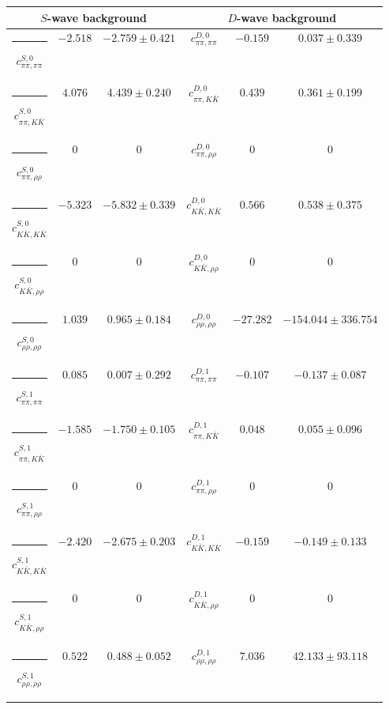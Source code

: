 \begin{table}[h]
\begin{ruledtabular}
\begin{tabular}{c c c c c c c c c}
\end{tabular}
\vspace{2em}
\begin{tabular}{c c c c c c}
\multicolumn{3}{c}{$S$-wave background}  & \multicolumn{3}{c}{$D$-wave background} \\ \hline
\rule[-0.2cm]{-0.1cm}{.55cm} $c^{S,0}_{\pi\pi,\pi\pi}$ &$-2.518$ & $-2.759 \pm 0.421$ & $c^{D,0}_{\pi\pi,\pi\pi}$ &$-0.159$ & $0.037 \pm 0.339$ \\
\rule[-0.2cm]{-0.1cm}{.55cm} $c^{S,0}_{\pi\pi,K\bar K}$ &$4.076$ & $4.439 \pm 0.240$ & $c^{D,0}_{\pi\pi,K\bar K}$ &$0.439$ & $0.361 \pm 0.199$ \\
\rule[-0.2cm]{-0.1cm}{.55cm} $c^{S,0}_{\pi\pi,\rho\rho}$ &$0$ & $0$ & $c^{D,0}_{\pi\pi,\rho\rho}$ &$0$ & $0$ \\
\rule[-0.2cm]{-0.1cm}{.55cm} $c^{S,0}_{K\bar K,K\bar K}$ &$-5.323$ & $-5.832 \pm 0.339$ & $c^{D,0}_{K\bar K,K\bar K}$ &$0.566$ & $0.538 \pm 0.375$ \\
\rule[-0.2cm]{-0.1cm}{.55cm} $c^{S,0}_{K\bar K,\rho\rho}$ &$0$ & $0$ & $c^{D,0}_{K\bar K,\rho\rho}$ &$0$ & $0$ \\
\rule[-0.2cm]{-0.1cm}{.55cm} $c^{S,0}_{\rho\rho,\rho\rho}$ &$1.039$ & $0.965 \pm 0.184$ & $c^{D,0}_{\rho\rho,\rho\rho}$ &$-27.282$ & $-154.044 \pm 336.754$ \\
\rule[-0.2cm]{-0.1cm}{.55cm} $c^{S,1}_{\pi\pi,\pi\pi}$ &$0.085$ & $0.007 \pm 0.292$ & $c^{D,1}_{\pi\pi,\pi\pi}$ &$-0.107$ & $-0.137 \pm 0.087$ \\
\rule[-0.2cm]{-0.1cm}{.55cm} $c^{S,1}_{\pi\pi,K\bar K}$ &$-1.585$ & $-1.750 \pm 0.105$ & $c^{D,1}_{\pi\pi,K\bar K}$ &$0.048$ & $0.055 \pm 0.096$ \\
\rule[-0.2cm]{-0.1cm}{.55cm} $c^{S,1}_{\pi\pi,\rho\rho}$ &$0$ & $0$ & $c^{D,1}_{\pi\pi,\rho\rho}$ &$0$ & $0$ \\
\rule[-0.2cm]{-0.1cm}{.55cm} $c^{S,1}_{K\bar K,K\bar K}$ &$-2.420$ & $-2.675 \pm 0.203$ & $c^{D,1}_{K\bar K,K\bar K}$ &$-0.159$ & $-0.149 \pm 0.133$ \\
\rule[-0.2cm]{-0.1cm}{.55cm} $c^{S,1}_{K\bar K,\rho\rho}$ &$0$ & $0$ & $c^{D,1}_{K\bar K,\rho\rho}$ &$0$ & $0$ \\
\rule[-0.2cm]{-0.1cm}{.55cm} $c^{S,1}_{\rho\rho,\rho\rho}$ &$0.522$ & $0.488 \pm 0.052$ & $c^{D,1}_{\rho\rho,\rho\rho}$ &$7.036$ & $42.133 \pm 93.118$ \\
\end{tabular}
\end{ruledtabular}
\end{table}
